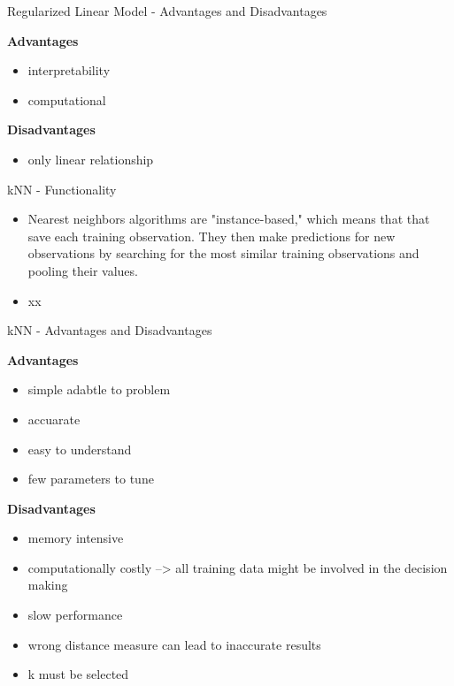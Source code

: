 \documentclass[11pt,compress,t,notes=noshow, xcolor=table]{beamer}
\begin{document}
\begin{frame}{Regularized Linear Model - Advantages and Disadvantages}

\textbf{Advantages}
\begin{itemize}
\item interpretability
\item computational 
\end{itemize}


\textbf{Disadvantages}
\begin{itemize}
\item only linear relationship
\end{itemize}
\end{frame}



\begin{frame}{kNN - Functionality}

\begin{itemize}
\item Nearest neighbors algorithms are "instance-based," which means that that save each training observation. They then make predictions for new observations by searching for the most similar training observations and pooling their values.
\item xx
\end{itemize}


\end{frame}

\begin{frame}{kNN - Advantages and Disadvantages}

\textbf{Advantages}
\begin{itemize}
\item simple adabtle to problem 
\item accuarate
\item easy to understand
\item few parameters to tune
\end{itemize}


\textbf{Disadvantages}
\begin{itemize}
\item memory intensive
\item computationally costly --> all training data might be involved in the decision making
\item slow performance
\item wrong distance measure can lead to inaccurate results 
\item k must be selected
\end{itemize}
\end{frame}

\endlecture
\end{document}
